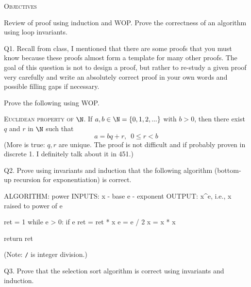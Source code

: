 


\renewcommand\TITLE{Assignment 3}


\topmatter

\textsc{Objectives}
\begin{itemize}
  \li Review of proof using induction and WOP. 
  \li Prove the correctness of an algorithm using loop invariants.
\end{itemize}


\newpage
Q1.
Recall from class, I mentioned that there are some proofs
that you must know because these proofs almost form a template for many other
proofs.
The goal of this question is not to design a proof,
but rather to re-study a given proof very carefully and write an absolutely
correct proof in your own words and possible filling gaps if necessary.

Prove the following using WOP.

\textsc{Euclidean property of $\N$.}
If $a, b \in \N = \{0, 1, 2, ...\}$ with $b > 0$,
then there exist $q$ and $r$ in $\N$ such that
\[
a = bq + r, \,\,\, 0 \leq r < b
\]
(More is true: $q,r$ are unique. The proof is not difficult
and if probably proven in discrete 1. I definitely talk about it in 451.)

\SOLUTION



\newpage
Q2. Prove using invariants and induction that the following algorithm
(bottom-up recursion for exponentiation) is
correct.
\begin{console}
ALGORITHM: power
INPUTS: x - base
        e - exponent
OUTPUT: x^e, i.e., x raised to power of e

ret = 1
while e > 0:
    if e %
        ret = ret * x
    e = e / 2
    x = x * x
    
return ret
\end{console}
(Note: \texttt{/} is integer division.)

\SOLUTION



\newpage
Q3.
Prove that the selection sort algorithm is correct using invariants
and induction.

\SOLUTION





